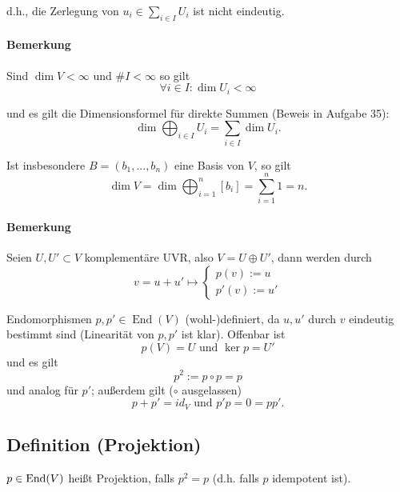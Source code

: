 	d.h., die Zerlegung von $ u_i\in \sum_{i\in I}U_i $ ist nicht eindeutig.

\paragraph{Bemerkung}
	Sind $ \dim V <\infty $ und $ \# I < \infty $ so gilt
		\begin{equation*}
		\forall i\in I: \dim U_i < \infty
		\end{equation*}
		
	und es gilt die Dimensionsformel für direkte Summen (Beweis in Aufgabe 35):
		\begin{equation*}
		\dim \bigoplus_{i\in I}U_i = \sum_{i\in I} \dim U_i.
		\end{equation*}
	
	Ist insbesondere $ B=(b_1,...,b_n) $ eine Basis von $ V $, so gilt
		\begin{equation*}
		\dim V = \dim \bigoplus_{i=1}^n [b_i]=\sum_{i=1}^{n}1 = n.
		\end{equation*}
		
\paragraph{Bemerkung}
	Seien $ U,U'\subset V $ komplementäre UVR, also $ V = U \oplus U' $, dann werden durch
		\begin{equation*}
		v = u+u' \mapsto
			\begin{cases}
				p(v):=u\\
				p'(v):= u'
			\end{cases}
		\end{equation*}
	
	Endomorphismen $ p,p'\in \operatorname{End}(V) $ (wohl-)definiert, da $ u,u' $ durch $ v $ eindeutig bestimmt sind (Linearität von $ p,p' $ ist klar).
	Offenbar ist 
		\[ p(V) = U \text{ und } \ker p = U'\]
	und es gilt
		\[ p^2 := p\circ p = p \]
	und analog für $ p' $; außerdem gilt ($ \circ $ ausgelassen)
		\[ p+p' = id_V \text{ und } p'p = 0 = pp'.\]
		
\subsection{Definition (Projektion)}
	\begin{Definition}[Projektion]
		$ p\in \operatorname{End}(V) $ heißt Projektion, falls $ p^2 = p $ (d.h. falls $ p $ idempotent ist).
	\end{Definition}
	
